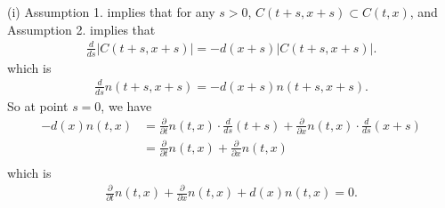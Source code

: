 \documentclass[pdf]{article}
\begin{document}
(i) Assumption 1. implies that for any $s>0$, $C(t+s, x+s)\subset C(t,x)$, and Assumption 2. implies that 
\begin{align}\label{Question7Assumption1}
\frac{d}{ds}|C(t+s,x+s)| = -d(x+s)|C(t+s,x+s)|.
\end{align}
which is
\begin{align*}
\frac{d}{ds}n(t+s,x+s) = -d(x+s)n(t+s,x+s).
\end{align*}
So at point $s=0$, we have
\begin{align*}
-d(x)n(t, x) &= \frac{\partial}{\partial t}n(t,x)\cdot \frac{d}{ds}(t+s) + \frac{\partial}{\partial x}n(t,x)\cdot \frac{d}{ds}(x+s)\\
                    &= \frac{\partial}{\partial t}n(t,x) + \frac{\partial}{\partial x}n(t,x)\\
\end{align*}
which is
\begin{align*}
\frac{\partial}{\partial t}n(t,x) + \frac{\partial}{\partial x}n(t,x) + d(x)n(t, x) = 0.
\end{align*}
\end{document}
